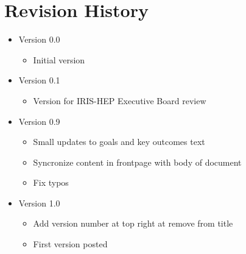 \documentclass[11pt,letterpaper,fleqn]{article}
\begin{document}
\appendix
\newpage
\section{Revision History}

\vspace{8pt}
\begin{itemize}
  \item Version 0.0
  \vspace{-5pt}
  \begin{itemize}
    \item Initial version
  \end{itemize}
  \item Version 0.1
  \vspace{-5pt}
  \begin{itemize}
    \item Version for IRIS-HEP Executive Board review
  \end{itemize}
  \item Version 0.9
  \vspace{-5pt}
  \begin{itemize}
    \item Small updates to goals and key outcomes text
    \item Syncronize content in frontpage with body of document
    \item Fix typos
  \end{itemize}
  \item Version 1.0
  \vspace{-5pt}
  \begin{itemize}
    \item Add version number at top right at remove from title
    \item First version posted
  \end{itemize}
\end{itemize}
\end{document}
